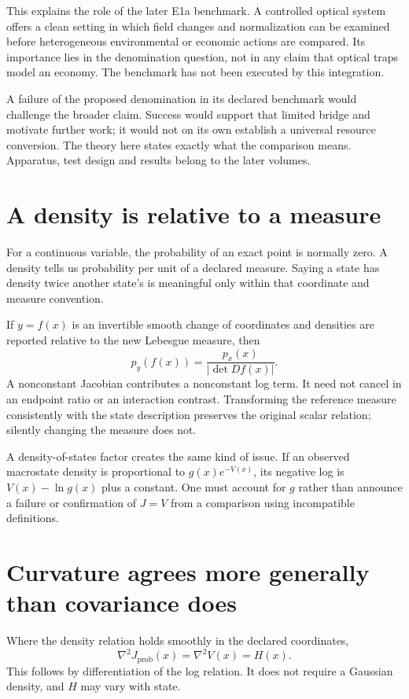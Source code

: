 This explains the role of the later E1a benchmark. A controlled optical system offers a clean setting in which field changes and normalization can be examined before heterogeneous environmental or economic actions are compared. Its importance lies in the denomination question, not in any claim that optical traps model an economy. The benchmark has not been executed by this integration.

A failure of the proposed denomination in its declared benchmark would challenge the broader claim. Success would support that limited bridge and motivate further work; it would not on its own establish a universal resource conversion. The theory here states exactly what the comparison means. Apparatus, test design and results belong to the later volumes.

\section{A density is relative to a measure}
For a continuous variable, the probability of an exact point is normally zero. A density tells us probability per unit of a declared measure. Saying a state has density twice another state's is meaningful only within that coordinate and measure convention.

If $y=f(x)$ is an invertible smooth change of coordinates and densities are reported relative to the new Lebesgue measure, then
\begin{equation}\label{eq:density-jacobian}
 p_y(f(x))=\frac{p_x(x)}{|\det Df(x)|}.
\end{equation}
A nonconstant Jacobian contributes a nonconstant log term. It need not cancel in an endpoint ratio or an interaction contrast. Transforming the reference measure consistently with the state description preserves the original scalar relation; silently changing the measure does not.

A density-of-states factor creates the same kind of issue. If an observed macrostate density is proportional to $g(x)e^{-V(x)}$, its negative log is $V(x)-\ln g(x)$ plus a constant. One must account for $g$ rather than announce a failure or confirmation of $J=V$ from a comparison using incompatible definitions.

\section{Curvature agrees more generally than covariance does}
Where the density relation holds smoothly in the declared coordinates,
\begin{equation}\label{eq:hessian-equality}
 \nabla^2J_{\mathrm{prob}}(x)=\nabla^2V(x)=H(x).
\end{equation}
This follows by differentiation of the log relation. It does not require a Gaussian density, and $H$ may vary with state.

